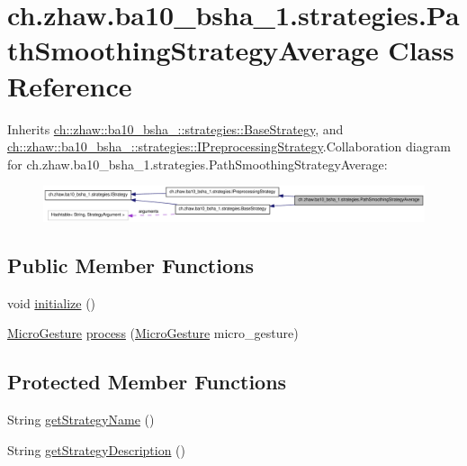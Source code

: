 \hypertarget{classch_1_1zhaw_1_1ba10__bsha__1_1_1strategies_1_1PathSmoothingStrategyAverage}{
\section{ch.zhaw.ba10\_\-bsha\_\-1.strategies.PathSmoothingStrategyAverage Class Reference}
\label{classch_1_1zhaw_1_1ba10__bsha__1_1_1strategies_1_1PathSmoothingStrategyAverage}
}


Inherits \hyperlink{classch_1_1zhaw_1_1ba10__bsha__1_1_1strategies_1_1BaseStrategy}{ch::zhaw::ba10\_\-bsha\_::strategies::BaseStrategy}, and \hyperlink{interfacech_1_1zhaw_1_1ba10__bsha__1_1_1strategies_1_1IPreprocessingStrategy}{ch::zhaw::ba10\_\-bsha\_::strategies::IPreprocessingStrategy}.Collaboration diagram for ch.zhaw.ba10\_\-bsha\_\-1.strategies.PathSmoothingStrategyAverage:\nopagebreak
\begin{figure}[H]
\begin{center}
\leavevmode
\includegraphics[width=400pt]{classch_1_1zhaw_1_1ba10__bsha__1_1_1strategies_1_1PathSmoothingStrategyAverage__coll__graph}
\end{center}
\end{figure}
\subsection*{Public Member Functions}
\begin{DoxyCompactItemize}
\item 
void \hyperlink{classch_1_1zhaw_1_1ba10__bsha__1_1_1strategies_1_1PathSmoothingStrategyAverage_a099125627db9d618ec732fe47250f7f5}{initialize} ()
\item 
\hyperlink{classch_1_1zhaw_1_1ba10__bsha__1_1_1service_1_1MicroGesture}{MicroGesture} \hyperlink{classch_1_1zhaw_1_1ba10__bsha__1_1_1strategies_1_1PathSmoothingStrategyAverage_a1f021ea53245e6ebfa044ca3bb8b0210}{process} (\hyperlink{classch_1_1zhaw_1_1ba10__bsha__1_1_1service_1_1MicroGesture}{MicroGesture} micro\_\-gesture)
\end{DoxyCompactItemize}
\subsection*{Protected Member Functions}
\begin{DoxyCompactItemize}
\item 
String \hyperlink{classch_1_1zhaw_1_1ba10__bsha__1_1_1strategies_1_1PathSmoothingStrategyAverage_a3f53ea1550d9fd947e54fab6150b6ed9}{getStrategyName} ()
\item 
String \hyperlink{classch_1_1zhaw_1_1ba10__bsha__1_1_1strategies_1_1PathSmoothingStrategyAverage_a153e28cad8f65a4477594ee20598d3cf}{getStrategyDescription} ()
\end{DoxyCompactItemize}


